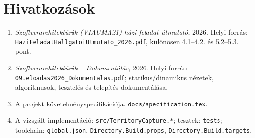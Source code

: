 \documentclass[11pt,a4paper]{article}
\newcommand{\code}[1]{\nolinkurl{#1}}
\begin{document}
\section*{Hivatkozások}
\begin{enumerate}
\item \emph{Szoftverarchitektúrák (VIAUMA21) házi feladat útmutató}, 2026. Helyi forrás: \code{HaziFeladatHallgatoiUtmutato_2026.pdf}, különösen 4.1--4.2. és 5.2--5.3. pont.
\item \emph{Szoftverarchitektúrák -- Dokumentálás}, 2026. Helyi forrás: \code{09.eloadas2026_Dokumentalas.pdf}; statikus/dinamikus nézetek, algoritmusok, tesztelés és telepítés dokumentálása.
\item A projekt követelményspecifikációja: \code{docs/specification.tex}.
\item A vizsgált implementáció: \code{src/TerritoryCapture.*}; tesztek: \code{tests}; toolchain: \code{global.json}, \code{Directory.Build.props}, \code{Directory.Build.targets}.
\end{enumerate}
\end{document}
